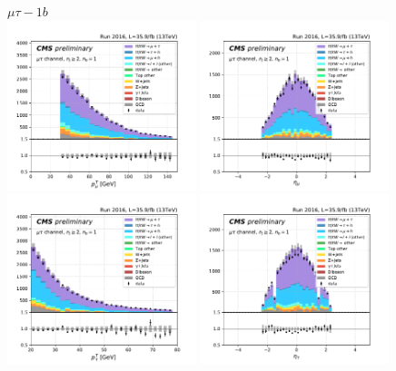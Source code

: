\begin{figure}[ht]
    \centering
    $\mu\tau - 1b$ \\
    \includegraphics[width=0.49\textwidth]{chapters/Appendix/sectionPlots/figures/kinematics_pickles/mutau/1b/mutau_1b_lepton1_pt.pdf}
    \includegraphics[width=0.49\textwidth]{chapters/Appendix/sectionPlots/figures/kinematics_pickles/mutau/1b/mutau_1b_lepton1_eta.pdf}
    \includegraphics[width=0.49\textwidth]{chapters/Appendix/sectionPlots/figures/kinematics_pickles/mutau/1b/mutau_1b_lepton2_pt.pdf}
    \includegraphics[width=0.49\textwidth]{chapters/Appendix/sectionPlots/figures/kinematics_pickles/mutau/1b/mutau_1b_lepton2_eta.pdf}

\end{figure}
